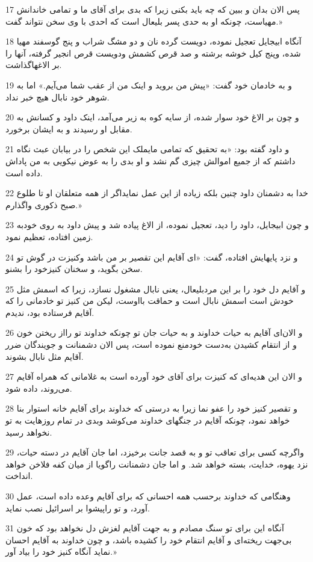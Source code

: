\par 17 پس الان بدان و ببین که چه باید بکنی زیرا که بدی برای آقای ما و تمامی خاندانش مهیاست، چونکه او به حدی پسر بلیعال است که احدی با وی سخن نتواند گفت.» 
\par 18 آنگاه ابیجایل تعجیل نموده، دویست گرده نان و دو مشگ شراب و پنج گوسفند مهیا شده، وپنج کیل خوشه برشته و صد قرص کشمش ودویست قرص انجیر گرفته، آنها را بر الاغهاگذاشت.
\par 19 و به خادمان خود گفت: «پیش من بروید و اینک من از عقب شما می‌آیم.» اما به شوهر خود نابال هیچ خبر نداد.
\par 20 و چون بر الاغ خود سوار شده، از سایه کوه به زیر می‌آمد، اینک داود و کسانش به مقابل او رسیدند و به ایشان برخورد.
\par 21 و داود گفته بود: «به تحقیق که تمامی مایملک این شخص را در بیابان عبث نگاه داشتم که از جمیع اموالش چیزی گم نشد و او بدی را به عوض نیکویی به من پاداش داده است.
\par 22 خدا به دشمنان داود چنین بلکه زیاده از این عمل نمایداگر از همه متعلقان او تا طلوع صبح ذکوری واگذارم.»
\par 23 و چون ابیجایل، داود را دید، تعجیل نموده، از الاغ پیاده شد و پیش داود به روی خودبه زمین افتاده، تعظیم نمود.
\par 24 و نزد پایهایش افتاده، گفت: «ای آقایم این تقصیر بر من باشد وکنیزت در گوش تو سخن بگوید، و سخنان کنیزخود را بشنو.
\par 25 و آقایم دل خود را بر این مردبلیعال، یعنی نابال مشغول نسازد، زیرا که اسمش مثل خودش است اسمش نابال است و حماقت بااوست، لیکن من کنیز تو خادمانی را که آقایم فرستاده بود، ندیدم.
\par 26 و الان‌ای آقایم به حیات خداوند و به حیات جان تو چونکه خداوند تو رااز ریختن خون و از انتقام کشیدن به‌دست خودمنع نموده است، پس الان دشمنانت و جویندگان ضرر آقایم مثل نابال بشوند.
\par 27 و الان این هدیه‌ای که کنیزت برای آقای خود آورده است به غلامانی که همراه آقایم می‌روند، داده شود.
\par 28 و تقصیر کنیز خود را عفو نما زیرا به درستی که خداوند برای آقایم خانه استوار بنا خواهد نمود، چونکه آقایم در جنگهای خداوند می‌کوشد وبدی در تمام روزهایت به تو نخواهد رسید.
\par 29 واگر‌چه کسی برای تعاقب تو و به قصد جانت برخیزد، اما جان آقایم در دسته حیات، نزد یهوه، خدایت، بسته خواهد شد. و اما جان دشمنانت راگویا از میان کفه فلاخن خواهد انداخت.
\par 30 وهنگامی که خداوند بر‌حسب همه احسانی که برای آقایم وعده داده است، عمل آورد، و تو راپیشوا بر اسرائیل نصب نماید.
\par 31 آنگاه این برای تو سنگ مصادم و به جهت آقایم لغزش دل نخواهد بود که خون بی‌جهت ریخته‌ای و آقایم انتقام خود را کشیده باشد، و چون خداوند به آقایم احسان نماید آنگاه کنیز خود را بیاد آور.»
